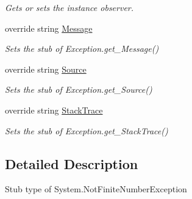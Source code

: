 \begin{DoxyCompactItemize}
\begin{DoxyCompactList}\small\item\em Gets or sets the instance observer.\end{DoxyCompactList}\item 
override string \hyperlink{class_system_1_1_fakes_1_1_stub_not_finite_number_exception_a7289269a0136d0b6d9f5cc12818d2e35}{Message}
\begin{DoxyCompactList}\small\item\em Sets the stub of Exception.\-get\-\_\-\-Message()\end{DoxyCompactList}\item 
override string \hyperlink{class_system_1_1_fakes_1_1_stub_not_finite_number_exception_aec9453989f2e7236397b5c8459a80f0e}{Source}
\begin{DoxyCompactList}\small\item\em Sets the stub of Exception.\-get\-\_\-\-Source()\end{DoxyCompactList}\item 
override string \hyperlink{class_system_1_1_fakes_1_1_stub_not_finite_number_exception_ae358d3703c7e7df92e5dacb5afd02fda}{Stack\-Trace}
\begin{DoxyCompactList}\small\item\em Sets the stub of Exception.\-get\-\_\-\-Stack\-Trace()\end{DoxyCompactList}\end{DoxyCompactItemize}


\subsection{Detailed Description}
Stub type of System.\-Not\-Finite\-Number\-Exception



